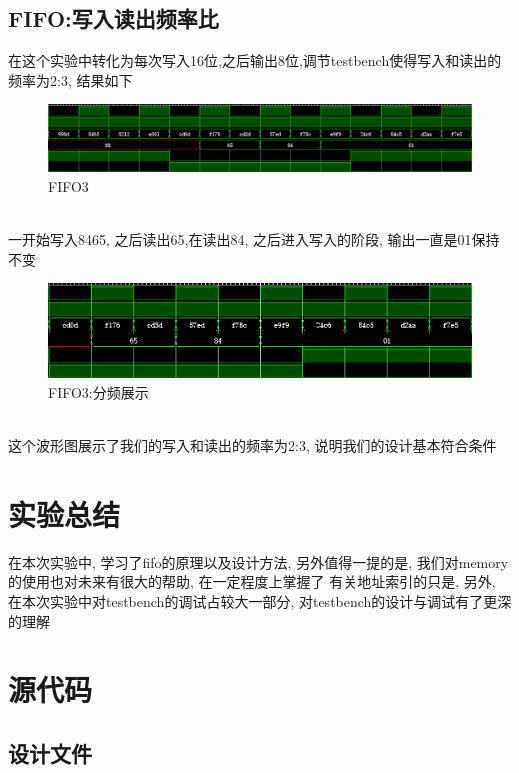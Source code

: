 \documentclass[fontset=windows,12pt]{article}
\begin{document}
\subsection{FIFO:写入读出频率比}
    在这个实验中转化为每次写入16位,之后输出8位,调节testbench使得写入和读出的频率为2:3, 结果如下\\
    \begin{figure}[!h]
        \centering
        \includegraphics[width=1\textwidth]{4.jpg}
        \caption{FIFO3}
    \end{figure}\\
    一开始写入8465, 之后读出65,在读出84, 之后进入写入的阶段, 输出一直是01保持不变\\
    \begin{figure}[ht]
        \centering
        \includegraphics[width=1\textwidth]{5.jpg}
        \caption{FIFO3:分频展示}
    \end{figure}\\
    这个波形图展示了我们的写入和读出的频率为2:3, 说明我们的设计基本符合条件



\section{实验总结}
在本次实验中, 学习了fifo的原理以及设计方法, 另外值得一提的是, 我们对memory的使用也对未来有很大的帮助, 在一定程度上掌握了
有关地址索引的只是. 另外, 在本次实验中对testbench的调试占较大一部分, 对testbench的设计与调试有了更深的理解
    



\section{源代码}
    \subsection{设计文件}
\end{document}
